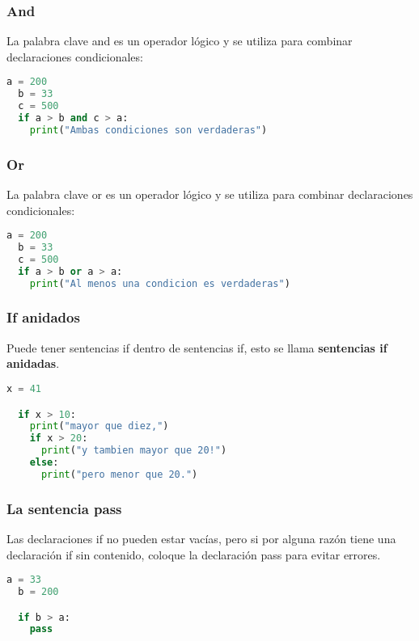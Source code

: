 \begin{frame}[fragile]
  \frametitle{And}

  La palabra clave \textcolor{codeKeyword}{and} es un operador lógico y
  se utiliza para combinar declaraciones condicionales: 

  \vspace{\baselineskip}
  \begin{lstlisting}[language=Python]
  a = 200
  b = 33
  c = 500
  if a > b and c > a:
    print("Ambas condiciones son verdaderas")
  \end{lstlisting}
\end{frame}

\begin{frame}[fragile]
  \frametitle{Or}

  La palabra clave \textcolor{codeKeyword}{or} es un operador lógico y
  se utiliza para combinar declaraciones condicionales: 

  \vspace{\baselineskip}
  \begin{lstlisting}[language=Python]
  a = 200
  b = 33
  c = 500
  if a > b or a > a:
    print("Al menos una condicion es verdaderas")
  \end{lstlisting}
\end{frame}

\begin{frame}[fragile]
  \frametitle{If anidados}

  Puede tener sentencias if dentro de sentencias if, esto se llama
  \textbf{sentencias if anidadas}.

  \vspace{\baselineskip}
  \begin{lstlisting}[language=Python]
  x = 41

  if x > 10:
    print("mayor que diez,")
    if x > 20:
      print("y tambien mayor que 20!")
    else:
      print("pero menor que 20.")
  \end{lstlisting}
\end{frame}

\begin{frame}[fragile]
  \frametitle{La sentencia \textbf{pass}}

  Las declaraciones if no pueden estar vacías, pero si por alguna razón
  tiene una declaración if sin contenido, coloque la declaración pass
  para evitar errores. 

  \vspace{\baselineskip}
  \begin{lstlisting}[language=Python]
  a = 33
  b = 200

  if b > a:
    pass
  \end{lstlisting}
\end{frame}

